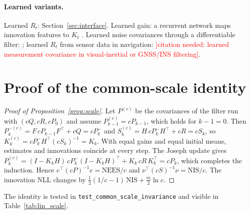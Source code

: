 \documentclass[11pt,a4paper]{article}
\newcommand{\todo}[1]{\textcolor{red}{[#1]}}
\newcommand{\tp}{^{\top}}
\begin{document}
\paragraph{Learned variants.} Learned $R_t$: Section~\ref{sec:interface}. Learned gain: a recurrent
network maps innovation features to $K_t$ \citep{revach2022}. Learned noise covariances through a
differentiable filter: \citep{haarnoja2016}; learned $R_t$ from sensor data in navigation:
\todo{citation needed: learned measurement covariance in visual-inertial or GNSS/INS filtering}.

\section{Proof of the common-scale identity}\label{app:proof}
\begin{proof}[Proof of Proposition~\ref{prop:scale}]
Let $P^{(c)}$ be the covariances of the filter run with $(cQ,cR,cP_0)$ and assume
$P^{(c)}_{k-1}=cP_{k-1}$, which holds for $k-1=0$. Then
$P^{-(c)}_k=F\,cP_{k-1}F\tp+cQ=cP^-_k$ and $S^{(c)}_k=H\,cP^-_kH\tp+cR=cS_k$, so
$K^{(c)}_k=cP^-_kH\tp(cS_k)^{-1}=K_k$. With equal gains and equal initial means, estimates and
innovations coincide at every step. The Joseph update gives
$P^{(c)}_k=(I-K_kH)\,cP^-_k(I-K_kH)\tp+K_k\,cR\,K_k\tp=cP_k$, which completes the induction. Hence
$e\tp(cP)^{-1}e=\mathrm{NEES}/c$ and $\nu\tp(cS)^{-1}\nu=\mathrm{NIS}/c$. The innovation NLL changes by
$\tfrac12(1/c-1)\,\mathrm{NIS}+\tfrac m2\ln c$.
\end{proof}
The identity is tested in \texttt{test\_common\_scale\_invariance} and visible in
Table~\ref{tab:lin_scale}.

\end{document}

